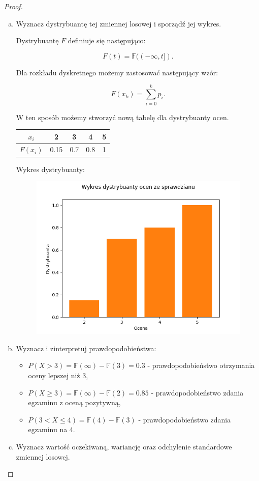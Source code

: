 \documentclass[11pt]{article}
\theoremstyle{definition}
\numberwithin{zadanie}{section}
\begin{document}
\begin{proof}
\begin{enumerate}[a)]
        \item Wyznacz dystrybuantę tej zmiennej losowej i sporządź jej wykres.

              Dystrybuantę $F$ definiuje się następująco:

              $$F(t) = \mathbb F((-\infty, t]).$$

              Dla rozkładu dyskretnego możemy zastosować następujący wzór:

              $$F(x_k) = \sum_{i=0}^{k} p_i.$$

              W ten sposób możemy stworzyć nową tabelę dla dystrybuanty ocen.

              \begin{center}
                  \begin{tabular}{ |c|c|c|c|c| }
                      \hline
                      $x_i$    & 2    & 3   & 4   & 5 \\
                      \hline
                      $F(x_i)$ & 0.15 & 0.7 & 0.8 & 1 \\
                      \hline
                  \end{tabular}
              \end{center}

              Wykres dystrybuanty:

              \begin{figure}[H]
                  \centering
                  \includegraphics[width=0.5\linewidth]{oceny-dyst.png}
              \end{figure}

        \item Wyznacz i zinterpretuj prawdopodobieństwa:
              \begin{itemize}
                  \item $P (X > 3) = \mathbb F(\infty) - \mathbb F(3) = 0.3$ - prawdopodobieństwo otrzymania oceny lepszej niż 3,
                  \item $P (X \geq 3) = \mathbb F(\infty) - \mathbb F(2) = 0.85$ - prawdopodobieństwo zdania egzaminu z oceną pozytywną,
                  \item $P (3 < X \leq 4) = \mathbb F(4) - \mathbb F(3)$ - prawdopodobieństwo zdania egzaminu na 4.
              \end{itemize}
        \item Wyznacz wartość oczekiwaną, wariancję oraz odchylenie standardowe zmiennej losowej.


\end{enumerate}
\end{proof}
\end{document}

